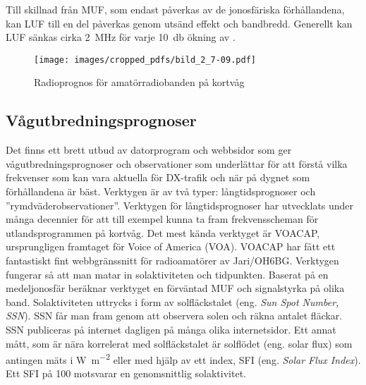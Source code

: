 Till skillnad från MUF, som endast påverkas av de jonosfäriska
förhållandena, kan LUF till en del påverkas genom utsänd effekt och bandbredd.
Generellt kan LUF sänkas cirka \qty{2}{\mega\hertz} för varje
\qty{10}{\decibel} ökning av \erp.

\begin{figure*}[t]
  \begin{center}
    \texttt{[image: images/cropped\_pdfs/bild\_2\_7-09.pdf]}
    \caption{Radioprognos för amatörradiobanden på kortvåg}
    \label{fig:bildII7-9}
  \end{center}
\end{figure*}

\subsection{Vågutbredningsprognoser}

Det finns ett brett utbud av datorprogram och webbsidor som ger
vågutbredningsprognoser och observationer som underlättar för att förstå vilka
frekvenser som kan vara aktuella för DX-trafik och när på dygnet som
förhållandena är bäst.
Verktygen är av två typer: långtidsprognoser och ''rymdväderobservationer''.
Verktygen för långtidsprognoser har utvecklats under många decennier för att
till exempel kunna ta fram frekvensscheman för utlandsprogrammen på kortvåg.
Det mest kända verktyget är VOACAP, ursprungligen framtaget för Voice of America
(VOA).
VOACAP har fått ett fantastiskt fint webbgränssnitt för radioamatörer av
Jari/OH6BG.
Verktygen fungerar så att man matar in solaktiviteten och tidpunkten.
Baserat på en medeljonosfär beräknar verktyget en förväntad MUF och signalstyrka
på olika band.
Solaktiviteten uttrycks i form av solfläckstalet (eng. \emph{Sun Spot Number, SSN}).
SSN får man fram genom att observera solen och räkna antalet fläckar.
SSN publiceras på internet dagligen på många olika internetsidor.
Ett annat mått, som är nära korrelerat med solfläckstalet är solflödet (eng.
solar flux) som antingen mäts i \unit{\watt\per\metre\squared} eller med hjälp
av ett index, SFI (eng. \emph{Solar Flux Index}).
Ett SFI på 100 motsvarar en genomsnittlig solaktivitet.


